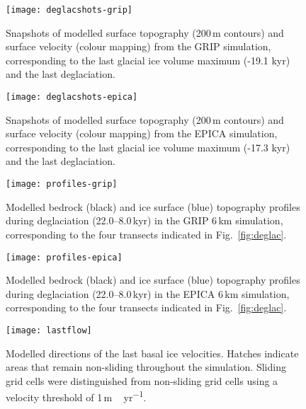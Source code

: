 \documentclass[tc, manuscript]{copernicus}
\begin{document}
\begin{figure*}
  \texttt{[image: deglacshots-grip]}
  \caption{Snapshots of modelled surface topography (200\,m contours)
           and surface velocity (colour mapping) from the GRIP simulation,
           corresponding to the last glacial ice volume maximum (-19.1 kyr) and
           the last deglaciation.}
  \label{fig:deglacshots-grip}
\end{figure*}

\begin{figure*}
  \texttt{[image: deglacshots-epica]}
  \caption{Snapshots of modelled surface topography (200\,m contours)
           and surface velocity (colour mapping) from the EPICA simulation,
           corresponding to the last glacial ice volume maximum (-17.3 kyr) and
           the last deglaciation.}
  \label{fig:deglacshots-epica}
\end{figure*}


\begin{figure}
  \texttt{[image: profiles-grip]}
  \caption{Modelled bedrock (black) and ice surface (blue) topography profiles
           during deglaciation (22.0--8.0\,kyr) in the GRIP 6\,km
           simulation, corresponding to the four transects indicated in
           Fig.~\ref{fig:deglac}.}
  \label{fig:profiles-grip}
\end{figure}

\begin{figure}
  \texttt{[image: profiles-epica]}
  \caption{Modelled bedrock (black) and ice surface (blue) topography profiles
           during deglaciation (22.0--8.0\,kyr) in the EPICA 6\,km
           simulation, corresponding to the four transects indicated in
           Fig.~\ref{fig:deglac}.}
  \label{fig:profiles-epica}
\end{figure}

\begin{figure*}
  \texttt{[image: lastflow]}
  \caption{Modelled directions of the last basal ice velocities. Hatches
           indicate areas that remain non-sliding throughout the simulation.
           Sliding grid cells were distinguished from non-sliding grid cells
           using a velocity threshold of 1\,\unit{m\,yr^{-1}}.}
  \label{fig:lastflow}
\end{figure*}

\end{document}

